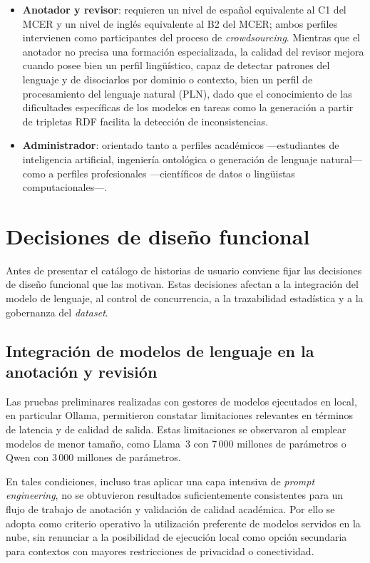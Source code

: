 \begin{itemize}
	\item \textbf{Anotador y revisor}: requieren un nivel de español equivalente al C1
	      del MCER y un nivel de inglés equivalente al B2 del MCER; ambos perfiles
	      intervienen como participantes del proceso de \textit{crowdsourcing}. Mientras
	      que el anotador no precisa una formación especializada, la calidad del revisor
	      mejora cuando posee bien un perfil lingüístico, capaz de detectar patrones del
	      lenguaje y de disociarlos por dominio o contexto, bien un perfil de
	      procesamiento del lenguaje natural (PLN), dado que el conocimiento de las
	      dificultades específicas de los modelos en tareas como la generación a partir
	      de tripletas RDF facilita la detección de inconsistencias.
	\item \textbf{Administrador}: orientado tanto a perfiles académicos ---estudiantes de
	      inteligencia artificial, ingeniería ontológica o generación de lenguaje
	      natural--- como a perfiles profesionales ---científicos de datos o lingüistas
	      computacionales---.
\end{itemize}

\section{Decisiones de diseño funcional}
\label{sec:diseno-funcional}

Antes de presentar el catálogo de historias de usuario conviene fijar las
decisiones de diseño funcional que las motivan. Estas decisiones afectan a la
integración del modelo de lenguaje, al control de concurrencia, a la
trazabilidad estadística y a la gobernanza del \textit{dataset}.

\subsection{Integración de modelos de lenguaje en la anotación y revisión}

Las pruebas preliminares realizadas con gestores de modelos ejecutados en
local, en particular Ollama, permitieron constatar limitaciones relevantes en
términos de latencia y de calidad de salida. Estas limitaciones se observaron
al emplear modelos de menor tamaño, como Llama~3 con 7\,000 millones de
parámetros o Qwen con 3\,000 millones de parámetros.

En tales condiciones, incluso tras aplicar una capa intensiva de \textit{prompt
	engineering}, no se obtuvieron resultados suficientemente consistentes para un
flujo de trabajo de anotación y validación de calidad académica. Por ello se
adopta como criterio operativo la utilización preferente de modelos servidos en
la nube, sin renunciar a la posibilidad de ejecución local como opción
secundaria para contextos con mayores restricciones de privacidad o
conectividad.

